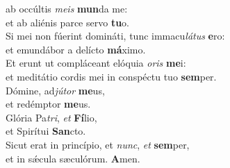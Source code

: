 \oddverse  ab occúltis \textit{me}\textit{is} \textbf{mun}da me:~\*\\
\oddverse et ab aliénis parce servo \textbf{tu}o.\\
\evenverse Si mei non fúerint domináti, tunc immacu\textit{lá}\textit{tus} \textbf{e}ro:~\*\\
\evenverse et emundábor a delícto \textbf{má}ximo.\\
\oddverse Et erunt ut compláceant elóquia \textit{o}\textit{ris} \textbf{me}i:~\*\\
\oddverse et meditátio cordis mei in conspéctu tuo \textbf{sem}per.\\
\evenverse Dómine, ad\textit{jú}\textit{tor} \textbf{me}us,~\*\\
\evenverse et redémptor \textbf{me}us.\\
\oddverse Glória Pa\textit{tri}, \textit{et} \textbf{Fí}lio,~\*\\
\oddverse et Spirítui \textbf{San}cto.\\
\evenverse Sicut erat in princípio, et \textit{nunc}, \textit{et} \textbf{sem}per,~\*\\
\evenverse et in sǽcula sæculórum. \textbf{A}men.\\
